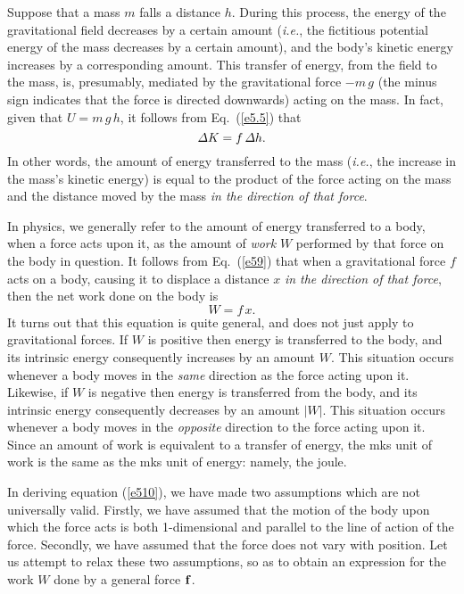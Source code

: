 Suppose that a mass $m$ falls a distance $h$. During this process, the energy of
the gravitational field decreases by a certain amount ({\em i.e.}, the fictitious
potential energy of the mass decreases by a certain  amount), and the body's
kinetic energy increases by a corresponding amount. This transfer of
energy, from the field to the mass,
 is, presumably, mediated by the gravitational force $-m\,g$ (the minus sign
indicates that the force is directed downwards) acting on the mass. In fact,
given that $U=m\,g\,h$, it follows from Eq.~(\ref{e5.5}) that
\begin{equation}\label{e59}
{\mit\Delta}K = f\,{\mit\Delta h}.
\end{equation}
In other words, the amount of energy transferred to the mass ({\em i.e.}, the increase in the
mass's kinetic energy) is equal to the product of the force acting on the
mass and the distance moved by the mass {\em in the direction of that force}. 

In physics, we generally refer to the
amount of energy transferred to a body, when a force acts upon it, as
the amount of {\em work} $W$ performed by that force on the body in question. It follows from
Eq.~(\ref{e59}) that when a gravitational force $f$ acts on a body,
causing it to displace a distance $x$ {\em in the direction of that force},
then the net work done on the body is
\begin{equation}\label{e510}
W = f\,x.
\end{equation}
It turns out that this equation is quite general, and does not just apply to
gravitational forces. If $W$ is positive then energy is transferred to the body, and
its intrinsic energy consequently increases by an amount $W$. This situation occurs whenever
a body moves in the {\em same} direction as the force acting upon it.
 Likewise,
if $W$ is negative then energy is transferred from the body, and its 
intrinsic energy consequently decreases  by an amount $|W|$. This situation occurs whenever
a body moves in the {\em opposite} direction to the force acting upon it.
Since an amount of work
is equivalent to a transfer of energy, the mks unit of work is the same as the
mks unit of energy: namely, the joule.

In deriving equation (\ref{e510}), we have made two assumptions which are not universally
valid. Firstly, we have assumed that the motion of the body upon which the force acts is
both 1-dimensional and parallel to the line of action of the force.
 Secondly, we have assumed that the force does not vary with position. 
Let us attempt to relax these two assumptions, so as to obtain an expression for the
work $W$ done by a general force ${\bf f}$. 

